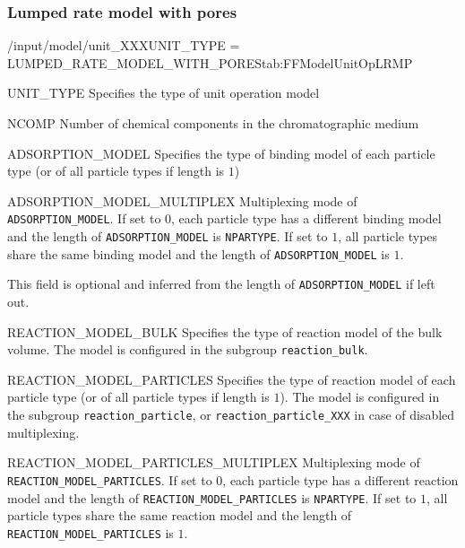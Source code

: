 \subsubsection{Lumped rate model with pores}

\begin{condsubgroup}{/input/model/unit\_XXX}{UNIT\_TYPE = LUMPED\_RATE\_MODEL\_WITH\_PORES}{tab:FFModelUnitOpLRMP}
  \begin{dataset}[type=string,range={\texttt{LUMPED\_RATE\_MODEL\_WITH\_PORES}},length=1]{UNIT\_TYPE}
    Specifies the type of unit operation model
  \end{dataset}
  \begin{dataset}[type=int,range={$\geq 1$},length=1]{NCOMP}
    Number of chemical components in the chromatographic medium
  \end{dataset}
  \begin{dataset}[type=string,range={See Section~\ref{sec:FFAdsorption}},length={$1$ / \texttt{NPARTYPE}}]{ADSORPTION\_MODEL}
    Specifies the type of binding model of each particle type (or of all particle types if length is $1$)
  \end{dataset}
  \begin{dataset}[unit=--,type=int,range={$\{0, 1\}$},length={1}]{ADSORPTION\_MODEL\_MULTIPLEX}
    Multiplexing mode of \texttt{ADSORPTION\_MODEL}.
    If set to $0$, each particle type has a different binding model and the length of \texttt{ADSORPTION\_MODEL} is \texttt{NPARTYPE}.
    If set to $1$, all particle types share the same binding model and the length of \texttt{ADSORPTION\_MODEL} is $1$.

    This field is optional and inferred from the length of \texttt{ADSORPTION\_MODEL} if left out.
  \end{dataset}
  \begin{dataset}[type=string,range={See Section~\ref{sec:FFReaction}},length=1]{REACTION\_MODEL\_BULK}
    Specifies the type of reaction model of the bulk volume.
    The model is configured in the subgroup \texttt{reaction\_bulk}.
  \end{dataset}
  \begin{dataset}[type=string,range={See Section~\ref{sec:FFReaction}},length={$1$ / \texttt{NPARTYPE}}]{REACTION\_MODEL\_PARTICLES}
    Specifies the type of reaction model of each particle type (or of all particle types if length is $1$).
    The model is configured in the subgroup \texttt{reaction\_particle}, or \texttt{reaction\_particle\_XXX} in case of disabled multiplexing.
  \end{dataset}
  \begin{dataset}[unit=--,type=int,range={$\{0, 1\}$},length={1}]{REACTION\_MODEL\_PARTICLES\_MULTIPLEX}
    Multiplexing mode of \texttt{REACTION\_MODEL\_PARTICLES}.
    If set to $0$, each particle type has a different reaction model and the length of \texttt{REACTION\_MODEL\_PARTICLES} is \texttt{NPARTYPE}.
    If set to $1$, all particle types share the same reaction model and the length of \texttt{REACTION\_MODEL\_PARTICLES} is $1$.


\end{dataset}
\end{condsubgroup}
